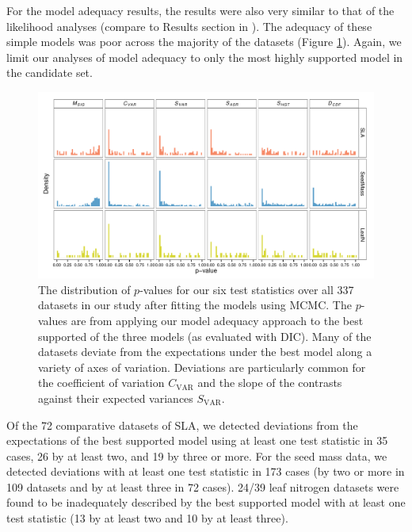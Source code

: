 For the model adequacy results, the results were also very similar to that of the likelihood analyses (compare to Results section in ). The adequacy of these simple models was poor across the majority of the datasets (Figure \ref{fig:supp-pvalues}). Again, we limit our analyses of model adequacy to only the most highly supported model in the candidate set.

\begin{figure}[p]
  \centering
  \includegraphics[angle=90, origin=c, scale=0.75]{figs/pval-hist-bayes}
  \caption[Distribution of $p$-values for all 337 datasets (Bayesian)]{The distribution of $p$-values for our six test statistics over all 337 datasets in our study after fitting the models using MCMC. The $p$-values are from applying our model adequacy approach to the best supported of the three models (as evaluated with DIC). Many of the datasets deviate from the expectations under the best model along a variety of axes of variation. Deviations are particularly common for the coefficient of variation $C_{\text{VAR}}$ and the slope of the contrasts against their expected variances $S_{\text{VAR}}$.}
  \label{fig:supp-pvalues}
\end{figure}


Of the 72 comparative datasets of SLA, we detected deviations from the expectations of the best supported model using at least one test statistic in 35 cases, 26 by at least two, and 19 by three or more.
For the seed mass data, we detected deviations with at least one test statistic in 173 cases (by two or more in 109 datasets and by at least three in 72 cases).
24/39 leaf nitrogen datasets were found to be inadequately described by the best supported model with at least one test statistic (13 by at least two and 10 by at least three).

